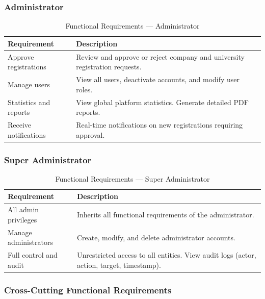 \subsubsection{Administrator}

\begin{table}[H]
\centering
\caption{Functional Requirements --- Administrator}
\label{tab:fr-admin}
\begin{tabular}{|p{4cm}|p{10cm}|}
\hline
\textbf{Requirement} & \textbf{Description} \\
\hline
Approve registrations & Review and approve or reject company and university registration requests. \\
\hline
Manage users & View all users, deactivate accounts, and modify user roles. \\
\hline
Statistics and reports & View global platform statistics. Generate detailed PDF reports. \\
\hline
Receive notifications & Real-time notifications on new registrations requiring approval. \\
\hline
\end{tabular}
\end{table}

\subsubsection{Super Administrator}

\begin{table}[H]
\centering
\caption{Functional Requirements --- Super Administrator}
\label{tab:fr-superadmin}
\begin{tabular}{|p{4cm}|p{10cm}|}
\hline
\textbf{Requirement} & \textbf{Description} \\
\hline
All admin privileges & Inherits all functional requirements of the administrator. \\
\hline
Manage administrators & Create, modify, and delete administrator accounts. \\
\hline
Full control and audit & Unrestricted access to all entities. View audit logs (actor, action, target, timestamp). \\
\hline
\end{tabular}
\end{table}

\subsubsection{Cross-Cutting Functional Requirements}


